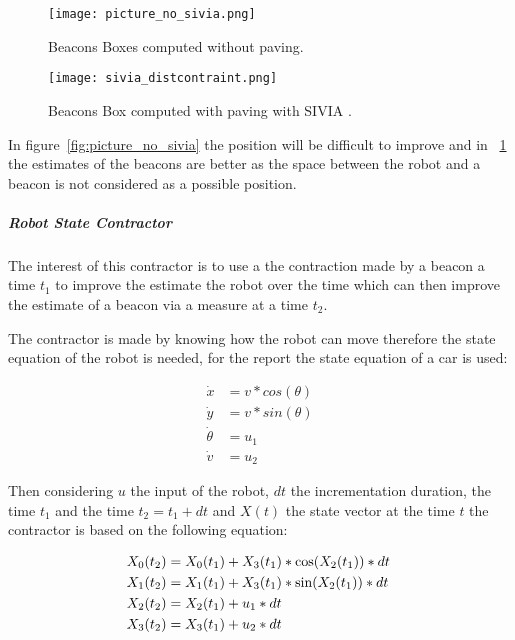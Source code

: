 \begin{figure}[H]
\centering
    \begin{minipage}[b]{0.4\textwidth}
    \texttt{[image: picture\_no\_sivia.png]}
    \caption{Beacons Boxes computed without paving.}
    \label{fig:picture_no_sivia}
    \end{minipage}
    \begin{minipage}[b]{0.4\textwidth}
    \texttt{[image: sivia\_distcontraint.png]}
    \caption{Beacons Box computed with paving with SIVIA \cite{jaulin1993set}.}
    \label{fig:sivia_distcontraint}
    \end{minipage}
\end{figure}

In figure~\ref{fig:picture_no_sivia} the position will be difficult to improve and in ~\ref{fig:sivia_distcontraint} the estimates of the beacons are better as the space between the robot and a beacon is not considered as a possible position.

\subparagraph{Robot State Contractor}

 The interest of this contractor is to use a the contraction made by a beacon a time $t_{1}$ to improve the estimate the robot over the time which can then improve the estimate of a beacon via a measure at a time $t_{2}$.

The contractor is made by knowing how the robot can move therefore the state equation of the robot is needed, for the report the state equation of a car is used:

\begin{align}
\dot{x} &= v*cos(\theta)\\
\dot{y} &= v*sin(\theta)\\
\dot{\theta} &= u_{1}\\
\dot{v} &= u_{2}
\end{align}

Then considering $u$ the input of the robot, $dt$ the incrementation duration, the time $t_{1}$ and the time $t_{2}=t_{1}+dt$ and $X(t)$ the state vector at the time $t$ the contractor is based on the following equation: 

\begin{align}
X_{0}(t_{2}) &= X_{0}(t_{1}) + X_{3}(t_{1})*\textnormal{cos}(X_{2}(t_{1}))*dt\,\\
X_{1}(t_{2}) &= X_{1}(t_{1}) + X_{3}(t_{1})*\textnormal{sin}(X_{2}(t_{1}))*dt\\
X_{2}(t_{2}) &= X_{2}(t_{1}) + u_{1}*dt\\
X_{3}(t_{2}) &= X_{3}(t_{1}) + u_{2}*dt
\end{align}

